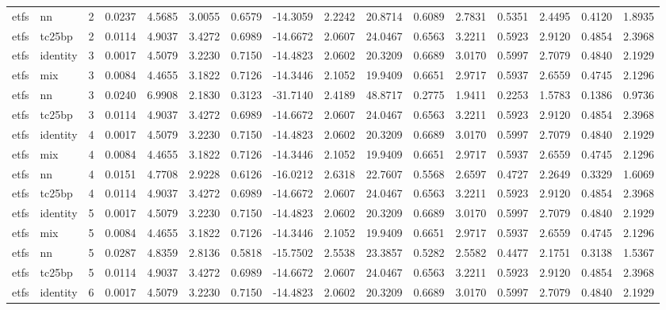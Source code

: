 \begin{tabular}{llrrrrrrrrrrrrrr}
etfs & nn & 2 & 0.0237 & 4.5685 & 3.0055 & 0.6579 & -14.3059 & 2.2242 & 20.8714 & 0.6089 & 2.7831 & 0.5351 & 2.4495 & 0.4120 & 1.8935 \\
etfs & tc25bp & 2 & 0.0114 & 4.9037 & 3.4272 & 0.6989 & -14.6672 & 2.0607 & 24.0467 & 0.6563 & 3.2211 & 0.5923 & 2.9120 & 0.4854 & 2.3968 \\
etfs & identity & 3 & 0.0017 & 4.5079 & 3.2230 & 0.7150 & -14.4823 & 2.0602 & 20.3209 & 0.6689 & 3.0170 & 0.5997 & 2.7079 & 0.4840 & 2.1929 \\
etfs & mix & 3 & 0.0084 & 4.4655 & 3.1822 & 0.7126 & -14.3446 & 2.1052 & 19.9409 & 0.6651 & 2.9717 & 0.5937 & 2.6559 & 0.4745 & 2.1296 \\
etfs & nn & 3 & 0.0240 & 6.9908 & 2.1830 & 0.3123 & -31.7140 & 2.4189 & 48.8717 & 0.2775 & 1.9411 & 0.2253 & 1.5783 & 0.1386 & 0.9736 \\
etfs & tc25bp & 3 & 0.0114 & 4.9037 & 3.4272 & 0.6989 & -14.6672 & 2.0607 & 24.0467 & 0.6563 & 3.2211 & 0.5923 & 2.9120 & 0.4854 & 2.3968 \\
etfs & identity & 4 & 0.0017 & 4.5079 & 3.2230 & 0.7150 & -14.4823 & 2.0602 & 20.3209 & 0.6689 & 3.0170 & 0.5997 & 2.7079 & 0.4840 & 2.1929 \\
etfs & mix & 4 & 0.0084 & 4.4655 & 3.1822 & 0.7126 & -14.3446 & 2.1052 & 19.9409 & 0.6651 & 2.9717 & 0.5937 & 2.6559 & 0.4745 & 2.1296 \\
etfs & nn & 4 & 0.0151 & 4.7708 & 2.9228 & 0.6126 & -16.0212 & 2.6318 & 22.7607 & 0.5568 & 2.6597 & 0.4727 & 2.2649 & 0.3329 & 1.6069 \\
etfs & tc25bp & 4 & 0.0114 & 4.9037 & 3.4272 & 0.6989 & -14.6672 & 2.0607 & 24.0467 & 0.6563 & 3.2211 & 0.5923 & 2.9120 & 0.4854 & 2.3968 \\
etfs & identity & 5 & 0.0017 & 4.5079 & 3.2230 & 0.7150 & -14.4823 & 2.0602 & 20.3209 & 0.6689 & 3.0170 & 0.5997 & 2.7079 & 0.4840 & 2.1929 \\
etfs & mix & 5 & 0.0084 & 4.4655 & 3.1822 & 0.7126 & -14.3446 & 2.1052 & 19.9409 & 0.6651 & 2.9717 & 0.5937 & 2.6559 & 0.4745 & 2.1296 \\
etfs & nn & 5 & 0.0287 & 4.8359 & 2.8136 & 0.5818 & -15.7502 & 2.5538 & 23.3857 & 0.5282 & 2.5582 & 0.4477 & 2.1751 & 0.3138 & 1.5367 \\
etfs & tc25bp & 5 & 0.0114 & 4.9037 & 3.4272 & 0.6989 & -14.6672 & 2.0607 & 24.0467 & 0.6563 & 3.2211 & 0.5923 & 2.9120 & 0.4854 & 2.3968 \\
etfs & identity & 6 & 0.0017 & 4.5079 & 3.2230 & 0.7150 & -14.4823 & 2.0602 & 20.3209 & 0.6689 & 3.0170 & 0.5997 & 2.7079 & 0.4840 & 2.1929 \\

\end{tabular}
